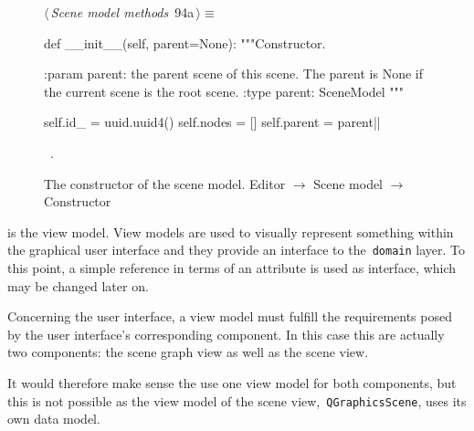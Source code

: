 \documentclass[%
    a4paper,    %
    justified,  %
    nobib,      %
    openany     %
]{tufte-book}
\makeatletter
\renewcommand{\label}[1]{\@tufte@label{##1}}%
\makeatother
\begin{document}
\begin{figure}[!htbp]
\begin{flushleft} \small
\begin{minipage}{\linewidth}\label{scrap22}\raggedright\small
{} $\langle\,${\itshape Scene model methods}\nobreak\ {\footnotesize {94a}}$\,\rangle\equiv$
\vspace{-1ex}
\begin{pythoncode}
def __init__(self, parent=None):
    """Constructor.

    :param parent: the parent scene of this scene. The parent is
                   None if the current scene is the root scene.
    :type parent:  SceneModel
    """

    self.id_ = uuid.uuid4()
    self.nodes = []
    self.parent = parent|\NWsep|
\end{pythoncode}
\vspace{1.5ex}
\footnotesize
\begin{list}{}{\setlength{\itemsep}{-\parsep}\setlength{\itemindent}{-\leftmargin}}
\item \NWtxtMacroRefIn\ .

\item{}
\end{list}
\end{minipage}\vspace{4ex}
\end{flushleft}
\caption{The constructor of the scene model.
  \newline{}\newline{}Editor $\rightarrow$ Scene model $\rightarrow$ Constructor}
\end{figure}

 is the view model. View models
are used to visually represent something within the graphical user interface and
they provide an interface to the~\verb=domain= layer. To this point, a simple
reference in terms of an attribute is used as interface, which may be changed
later on.

Concerning the user interface, a view model must fulfill the requirements posed
by the user interface's corresponding component. In this case this are actually
two components: the scene graph view as well as the scene view.

It would therefore make sense the use one view model for both components, but
this is not possible as the view model of the scene view,~\verb=QGraphicsScene=,
uses its own data model.
\end{document}
